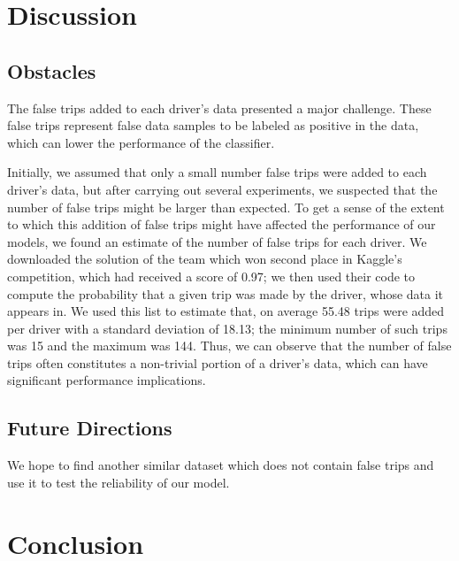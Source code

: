 \documentclass{article}
\begin{document}
\section{Discussion}
\subsection{Obstacles}

The false trips added to each driver's data presented a major challenge. These false trips represent false data samples to be labeled as positive in the data, which can lower the performance of the classifier.

Initially, we assumed that only a small number false trips were added to each driver's data, but after carrying out several experiments, we suspected that the number of false trips might be larger than expected. To get a sense of the extent to which this addition of false trips might have affected the performance of our models, we found an estimate of the number of false trips for each driver. We downloaded the solution of the team which won second place in Kaggle's competition, which had received a score of 0.97; we then used their code to compute the probability that a given trip was made by the driver, whose data it appears in. We used this list to estimate that, on average 55.48 trips were added per driver with a standard deviation of 18.13; the minimum number of such trips was 15 and the maximum was 144. Thus, we can observe that the number of false trips often constitutes a non-trivial portion of a driver's data, which can have significant performance implications. 

\subsection{Future Directions}
We hope to find another similar dataset which does not contain false trips and use it to test the reliability of our model. 



\section{Conclusion}

\newpage
\nocite{*}





\end{document}
